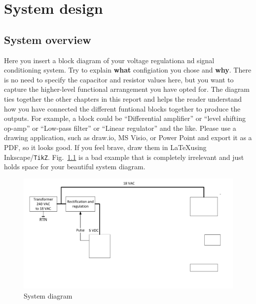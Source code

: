 
\chapter{System design}
\section{System overview} \label{sec:system}
Here you insert a block diagram of your voltage regulationa nd signal conditioning system. 
Try to explain \textbf{what} configiation you chose and \textbf{why}. 
There is no need to specify the capacitor and resistor values here, but you want to capture the higher-level functional arrangement you have opted for. The diagram ties together the other chapters in this report and helps the reader understand how you have connected the different funtional blocks together to produce the outputs. For example, a block could be ``Differential amplifier'' or ``level shifting op-amp'' or ``Low-pass filter'' or ``Linear regulator'' and the like. 
Please use a drawing application, such as draw.io, MS Visio, or Power Point and export it as a PDF, so it looks good. If you feel brave, draw them in \LaTeX using Inkscape/\texttt{TikZ}.
Fig.\ \ref{fig:system_diagram} is a bad example that is completely irrelevant and just holds space for your beautiful system diagram. 
\begin{figure}
    \centering
    \includegraphics[width = 0.5\linewidth]{Figures/PowerSystemDiagram.pdf}
    \caption{System diagram}
    \label{fig:system_diagram}
\end{figure}

\vfill










